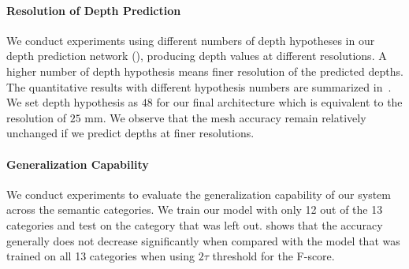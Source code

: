 \vspace{-2mm}
\paragraph{Resolution of Depth Prediction}
We conduct experiments using different numbers of depth hypotheses in our depth prediction network (), producing depth values at different resolutions.
A higher number of depth hypothesis means finer resolution of the predicted depths.
The quantitative results with different hypothesis numbers are summarized in~. We set depth hypothesis as $48$ for our final architecture which is equivalent to the resolution of $25$ mm.
We observe that the mesh accuracy remain relatively unchanged if we predict depths at finer resolutions.


\vspace{-2mm}
\paragraph{Generalization Capability}
We conduct experiments to evaluate the generalization capability of our system across the semantic categories. We train our model with only 12 out of the 13 categories and test on the category that was left out.  shows that the accuracy generally does not decrease significantly when compared with the model that was trained on all 13 categories when using $2\tau$ threshold for the F-score.


